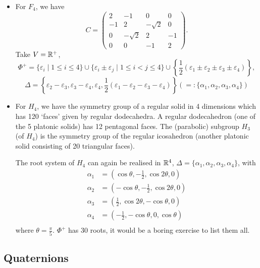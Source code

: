 \begin{itemize}
\item
For $F_4$, we have
\[
    C = \begin{pmatrix}
     2 &        -1 &         0 & 0 \\
    -1 &         2 & -\sqrt{2} & 0 \\
     0 & -\sqrt{2} &         2 & -1 \\
     0 &         0 &        -1 & 2
    \end{pmatrix}.
\]
Take $V = \mathbb{R}^+$,
\[
\Phi^+ = \{\varepsilon_i \mid 1 \leq i \leq 4 \} \cup
\{\varepsilon_i \pm \varepsilon_j \mid 1 \leq i < j \leq 4 \} \cup
\left\{\frac{1}{2} (\varepsilon_1 \pm \varepsilon_2 \pm \varepsilon_3 \pm
\varepsilon_4)\right\},
\]
\[
    \Delta = \left\{\varepsilon_2 - \varepsilon_3,
               \varepsilon_3 - \varepsilon_4,
               \varepsilon_4,
               \frac{1}{2} (\varepsilon_1 - \varepsilon_2 - \varepsilon_3
               - \varepsilon_4) \right\}
    (=: \{\alpha_1, \alpha_2, \alpha_3, \alpha_4\})
\]
\item
For $H_4$, we have the symmetry group of a regular solid in 4 dimensions which
has 120 `faces' given by regular dodecahedra.
A regular dodecahedron (one of the 5 platonic solids) has 12 pentagonal
faces. The (parabolic) subgroup $H_3$ (of $H_4$) is the symmetry group of the
regular icosahedron (another platonic solid consisting of 20 triangular
faces).

The root system of $H_4$ can again be realised in $\mathbb{R}^4$, $\Delta = \{\alpha_1,
\alpha_2, \alpha_3, \alpha_4\}$, with
\begin{align*}
    \alpha_1 &= \left(\cos \theta, -\frac{1}{2}, \cos 2\theta, 0 \right) \\
    \alpha_2 &= \left(-\cos \theta, -\frac{1}{2}, \cos 2\theta, 0 \right) \\
    \alpha_3 &= \left(\frac{1}{2}, \cos 2\theta, -\cos \theta, 0 \right) \\
    \alpha_4 &= \left(-\frac{1}{2}, -\cos \theta, 0, \cos \theta \right) \\
\end{align*}
where $\theta = \frac{\pi}{5}$.
$\Phi^+$ has 30 roots, it would be a boring exercise to list them all.
\end{itemize}

\subsection{Quaternions}

